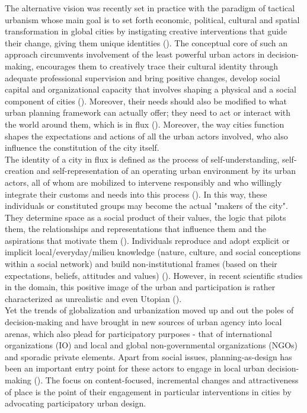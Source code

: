 \documentclass[11pt]{report}
\begin{document}
The alternative vision was recently set in practice with the paradigm of tactical urbanism whose main goal is to set forth economic, political, cultural and spatial transformation in global cities by instigating creative interventions that guide their change, giving them unique identities
(\href{Lydon}{\citealt{lydon_tactical_2012}}).
The conceptual core of such an approach circumvents involvement of the least powerful urban actors in decision-making, encourages them to creatively trace their cultural identity through adequate professional supervision and bring positive changes, develop social capital and organizational capacity that involves shaping a physical and a social component of cities
(\href{Bolay}{\citealt{bolay_planning_1996}}).
Moreover, their needs should also be modified to what urban planning framework can actually offer; they need to act or interact with the world around them, which is in flux
(\href{Harvey}{\citealt{harvey_condition_2003}}).
Moreover, the way cities function shapes the expectations and actions of all the urban actors involved, who also influence the constitution of the city itself.
\\

The identity of a city in flux is defined as the process of self-understanding, self-creation and self-representation of an operating urban environment by its urban actors, all of whom are mobilized to intervene responsibly and who willingly integrate their customs and needs into this process
(\href{Bolay}{\citealt{bolay_urban_2005}}).
In this way, these individuals or constituted groups may become the actual "makers of the city".
They determine space as a social product of their values, the logic that pilots them, the relationships and representations that influence them and the aspirations that motivate them (\href{Lefebvre}{\citealt{lefebvre_production_1974}}).
Individuals reproduce and adopt explicit or implicit local/everyday/milieu knowledge (nature, culture, and social conceptions within a social network) and build non-institutional frames (based on their expectations, beliefs, attitudes and values) (\href{Getimis}{\citealt{getimis_comparing_2012}}).
However, in recent scientific studies in the domain, this  positive image of the urban and participation is rather characterized as unrealistic and even Utopian
(\href{Lindner}{\citealt{lindner_XXXX_2009}}).
\\

Yet the trends of globalization and urbanization moved up and out the poles of decision-making and have brought in new sources of urban agency into local arenas, which also plead for participatory purposes - that of international organizations (IO) and local and global non-governmental organizations (NGOs) and sporadic private elements.
Apart from social issues, planning-as-design has been an important entry point for these actors to engage in local urban decision-making
(\href{Van}{\citealt{van_assche_co-evolutions_2013}}).
The focus on content-focused, incremental changes  and attractiveness of place is the point of their engagement in particular interventions in cities by advocating participatory urban design.
\\
\end{document}
